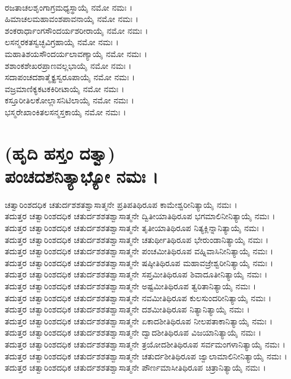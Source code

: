 \\
ರಜತಾಚಲಶೃಂಗಾಗ್ರಮಧ್ಯಸ್ಥಾಯೈ ನಮೋ ನಮಃ ।\\
ಹಿಮಾಚಲಮಹಾವಂಶಪಾವನಾಯೈ ನಮೋ ನಮಃ ।\\
ಶಂಕರಾರ್ಧಾಂಗಸೌಂದರ್ಯಶರೀರಾಯೈ ನಮೋ ನಮಃ ।\\
ಲಸನ್ಮರಕತಸ್ವಚ್ಛವಿಗ್ರಹಾಯೈ ನಮೋ ನಮಃ ।\\
ಮಹಾತಿಶಯಸೌಂದರ್ಯಲಾವಣ್ಯಾಯೈ ನಮೋ ನಮಃ ।\\
ಶಶಾಂಕಶೇಖರಪ್ರಾಣವಲ್ಲಭಾಯೈ ನಮೋ ನಮಃ ।\\
ಸದಾಪಂಚದಶಾತ್ಮೈಕ್ಯಸ್ವರೂಪಾಯೈ ನಮೋ ನಮಃ ।\\
ವಜ್ರಮಾಣಿಕ್ಯಕಟಕಕಿರೀಟಾಯೈ ನಮೋ ನಮಃ ।\\
ಕಸ್ತೂರೀತಿಲಕೋಲ್ಲಾಸನಿಟಿಲಾಯೈ ನಮೋ ನಮಃ ।\\
ಭಸ್ಮರೇಖಾಂಕಿತಲಸನ್ಮಸ್ತಕಾಯೈ ನಮೋ ನಮಃ ।

\section{(ಹೃದಿ ಹಸ್ತಂ ದತ್ವಾ)\\
ಪಂಚದಶನಿತ್ಯಾಭ್ಯೋ ನಮಃ ।}
ಚತ್ವಾರಿಂಶದಧಿಕ ಚತುರ್ದಶಶತಶ್ವಾಸಾತ್ಮನೇ ಪ್ರತಿಪತಿಥಿರೂಪ ಕಾಮೇಶ್ವರೀನಿತ್ಯಾಯೈ ನಮಃ ।\\
ತದುತ್ತರ ಚತ್ವಾರಿಂಶದಧಿಕ ಚತುರ್ದಶಶತಶ್ವಾಸಾತ್ಮನೇ ದ್ವಿತೀಯಾತಿಥಿರೂಪ ಭಗಮಾಲಿನೀನಿತ್ಯಾಯೈ ನಮಃ ।\\
ತದುತ್ತರ ಚತ್ವಾರಿಂಶದಧಿಕ ಚತುರ್ದಶಶತಶ್ವಾಸಾತ್ಮನೇ ತೃತೀಯಾತಿಥಿರೂಪ ನಿತ್ಯಕ್ಲಿನ್ನಾನಿತ್ಯಾಯೈ ನಮಃ ।\\
ತದುತ್ತರ ಚತ್ವಾರಿಂಶದಧಿಕ ಚತುರ್ದಶಶತಶ್ವಾಸಾತ್ಮನೇ ಚತುರ್ಥೀತಿಥಿರೂಪ ಭೇರುಂಡಾನಿತ್ಯಾಯೈ ನಮಃ ।\\
ತದುತ್ತರ ಚತ್ವಾರಿಂಶದಧಿಕ ಚತುರ್ದಶಶತಶ್ವಾಸಾತ್ಮನೇ ಪಂಚಮೀತಿಥಿರೂಪ ವಹ್ನಿವಾಸಿನೀನಿತ್ಯಾಯೈ ನಮಃ ।\\
ತದುತ್ತರ ಚತ್ವಾರಿಂಶದಧಿಕ ಚತುರ್ದಶಶತಶ್ವಾಸಾತ್ಮನೇ ಷಷ್ಠೀತಿಥಿರೂಪ ಮಹಾವಜ್ರೇಶ್ವರೀನಿತ್ಯಾಯೈ ನಮಃ ।\\
ತದುತ್ತರ ಚತ್ವಾರಿಂಶದಧಿಕ ಚತುರ್ದಶಶತಶ್ವಾಸಾತ್ಮನೇ ಸಪ್ತಮೀತಿಥಿರೂಪ ಶಿವಾದೂತೀನಿತ್ಯಾಯೈ ನಮಃ ।\\
ತದುತ್ತರ ಚತ್ವಾರಿಂಶದಧಿಕ ಚತುರ್ದಶಶತಶ್ವಾಸಾತ್ಮನೇ ಅಷ್ಟಮೀತಿಥಿರೂಪ ತ್ವರಿತಾನಿತ್ಯಾಯೈ ನಮಃ ।\\
ತದುತ್ತರ ಚತ್ವಾರಿಂಶದಧಿಕ ಚತುರ್ದಶಶತಶ್ವಾಸಾತ್ಮನೇ ನವಮೀತಿಥಿರೂಪ ಕುಲಸುಂದರೀನಿತ್ಯಾಯೈ ನಮಃ ।\\
ತದುತ್ತರ ಚತ್ವಾರಿಂಶದಧಿಕ ಚತುರ್ದಶಶತಶ್ವಾಸಾತ್ಮನೇ ದಶಮೀತಿಥಿರೂಪ ನಿತ್ಯಾನಿತ್ಯಾಯೈ ನಮಃ ।\\
ತದುತ್ತರ ಚತ್ವಾರಿಂಶದಧಿಕ ಚತುರ್ದಶಶತಶ್ವಾಸಾತ್ಮನೇ ಏಕಾದಶೀತಿಥಿರೂಪ ನೀಲಪತಾಕಾನಿತ್ಯಾಯೈ ನಮಃ ।\\
ತದುತ್ತರ ಚತ್ವಾರಿಂಶದಧಿಕ ಚತುರ್ದಶಶತಶ್ವಾಸಾತ್ಮನೇ ದ್ವಾದಶೀತಿಥಿರೂಪ ವಿಜಯಾನಿತ್ಯಾಯೈ ನಮಃ ।\\
ತದುತ್ತರ ಚತ್ವಾರಿಂಶದಧಿಕ ಚತುರ್ದಶಶತಶ್ವಾಸಾತ್ಮನೇ ತ್ರಯೋದಶೀತಿಥಿರೂಪ ಸರ್ವಮಂಗಳಾನಿತ್ಯಾಯೈ ನಮಃ ।\\
ತದುತ್ತರ ಚತ್ವಾರಿಂಶದಧಿಕ ಚತುರ್ದಶಶತಶ್ವಾಸಾತ್ಮನೇ ಚತುರ್ದಶೀತಿಥಿರೂಪ ಜ್ವಾಲಾಮಾಲಿನೀನಿತ್ಯಾಯೈ ನಮಃ ।\\
ತದುತ್ತರ ಚತ್ವಾರಿಂಶದಧಿಕ ಚತುರ್ದಶಶತಶ್ವಾಸಾತ್ಮನೇ ಪೌರ್ಣಮಾಸೀತಿಥಿರೂಪ ಚಿತ್ರಾನಿತ್ಯಾಯೈ ನಮಃ ।

